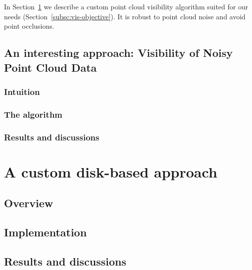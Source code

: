 In Section~\ref{sc:custom} we describe a custom point cloud visibility algorithm suited for our needs (Section~\ref{subsc:vis-objective}). It is robust to point cloud noise and avoid point occlusions.


\subsection{An interesting approach: Visibility of Noisy Point Cloud Data}
\label{subsc:noisy}

\subsubsection{Intuition}

\subsubsection{The algorithm}

\subsubsection{Results and discussions}


\section{A custom disk-based approach}
\label{sc:custom}

\subsection{Overview}


\subsection{Implementation}


\subsection{Results and discussions}
